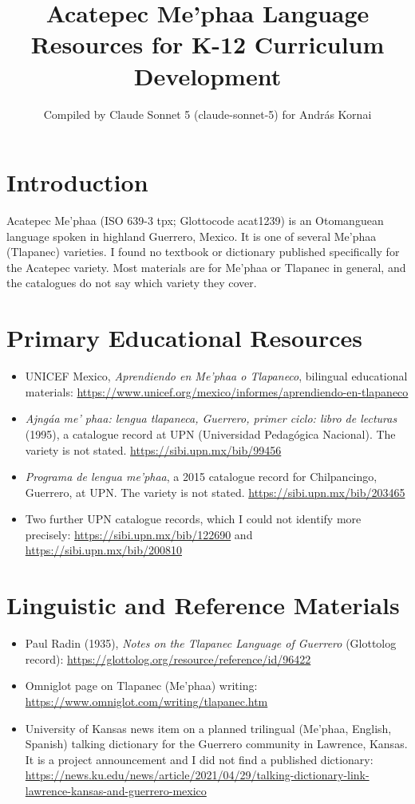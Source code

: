 \documentclass[12pt]{article}
\title{Acatepec Me'phaa Language Resources for K-12 Curriculum Development}
\author{Compiled by Claude Sonnet 5 (claude-sonnet-5) for Andr\'as Kornai}
\date{}
\begin{document}
\maketitle

\section{Introduction}
Acatepec Me'phaa (ISO 639-3 tpx; Glottocode acat1239) is an Otomanguean language spoken in highland Guerrero, Mexico. It is one of several Me'phaa (Tlapanec) varieties. I found no textbook or dictionary published specifically for the Acatepec variety. Most materials are for Me'phaa or Tlapanec in general, and the catalogues do not say which variety they cover.

\section{Primary Educational Resources}
\begin{itemize}
\item UNICEF Mexico, \emph{Aprendiendo en Me'phaa o Tlapaneco}, bilingual educational materials: \url{https://www.unicef.org/mexico/informes/aprendiendo-en-tlapaneco}
\item \emph{Ajng\'aa me' phaa: lengua tlapaneca, Guerrero, primer ciclo: libro de lecturas} (1995), a catalogue record at UPN (Universidad Pedag\'ogica Nacional). The variety is not stated. \url{https://sibi.upn.mx/bib/99456}
\item \emph{Programa de lengua me'phaa}, a 2015 catalogue record for Chilpancingo, Guerrero, at UPN. The variety is not stated. \url{https://sibi.upn.mx/bib/203465}
\item Two further UPN catalogue records, which I could not identify more precisely: \url{https://sibi.upn.mx/bib/122690} and \url{https://sibi.upn.mx/bib/200810}
\end{itemize}

\section{Linguistic and Reference Materials}
\begin{itemize}
\item Paul Radin (1935), \emph{Notes on the Tlapanec Language of Guerrero} (Glottolog record): \url{https://glottolog.org/resource/reference/id/96422}
\item Omniglot page on Tlapanec (Me'phaa) writing: \url{https://www.omniglot.com/writing/tlapanec.htm}
\item University of Kansas news item on a planned trilingual (Me'phaa, English, Spanish) talking dictionary for the Guerrero community in Lawrence, Kansas. It is a project announcement and I did not find a published dictionary: \url{https://news.ku.edu/news/article/2021/04/29/talking-dictionary-link-lawrence-kansas-and-guerrero-mexico}
\end{itemize}
\end{document}
